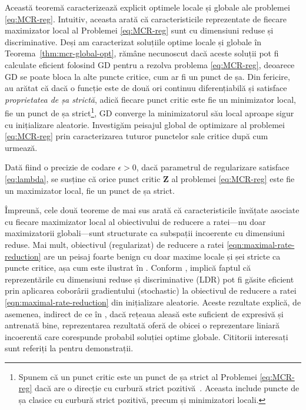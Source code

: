 \documentclass[../../book-main_ro.tex]{subfiles}
\begin{document}
Această teoremă caracterizează explicit optimele locale și globale ale problemei \eqref{eq:MCR-reg}. Intuitiv, aceasta arată că caracteristicile reprezentate de fiecare maximizator local al Problemei \eqref{eq:MCR-reg} sunt cu dimensiuni reduse și discriminative. Deși am caracterizat soluțiile optime locale și globale în Teorema~\ref{thm:mcr-global-opt}, rămâne necunoscut dacă aceste soluții pot fi calculate eficient folosind GD pentru a rezolva problema \eqref{eq:MCR-reg}, deoarece GD se poate bloca la alte puncte critice, cum ar fi un punct de șa.
Din fericire, \cite{sun2015nonconvex,lee2016gradient} au arătat că dacă o funcție este de două ori continuu diferențiabilă și satisface {\em proprietatea de șa strictă}, adică fiecare punct critic este fie un minimizator local, fie un punct de șa strict\footnote{Spunem că un punct critic este un punct de șa strict al Problemei \eqref{eq:MCR-reg} dacă are o direcție cu curbură strict pozitivă~\cite{sun2015nonconvex}. Aceasta include puncte de șa clasice cu curbură strict pozitivă, precum și minimizatori locali.}, GD converge la minimizatorul său local aproape sigur cu inițializare aleatorie. Investigăm peisajul global de optimizare al problemei \eqref{eq:MCR-reg} prin caracterizarea tuturor punctelor sale critice după cum urmează.

\begin{theorem}\label{thm:mcr-benign-opt-landscape}
	Dată fiind o precizie de codare $\epsilon > 0$, dacă parametrul de regularizare satisface \eqref{eq:lambda}, se susține că orice punct critic $\bm Z$ al problemei \eqref{eq:MCR-reg} este fie un maximizator local, fie un punct de șa strict.
\end{theorem}
Împreună, cele două teoreme de mai sus arată că caracteristicile învățate asociate cu fiecare maximizator local al obiectivului de reducere a ratei---nu doar maximizatorii globali---sunt structurate ca subspații incoerente cu dimensiuni reduse. Mai mult, obiectivul (regularizat) de reducere a ratei \eqref{eqn:maximal-rate-reduction} are un peisaj foarte benign cu doar maxime locale și șei stricte ca puncte critice, așa cum este ilustrat în .
Conform \cite{sun2015nonconvex,lee2016gradient},  implică faptul că reprezentările cu dimensiuni reduse și discriminative (LDR) pot fi găsite eficient prin aplicarea coborârii gradientului (stochastic) la obiectivul de reducere a ratei \eqref{eqn:maximal-rate-reduction} din inițializare aleatorie. Aceste rezultate explică, de asemenea, indirect de ce în , dacă rețeaua aleasă este suficient de expresivă și antrenată bine, reprezentarea rezultată oferă de obicei o reprezentare liniară incoerentă care corespunde probabil soluției optime globale.
Cititorii interesați sunt referiți la \cite{wang2024global} pentru demonstrații.
\end{document}
